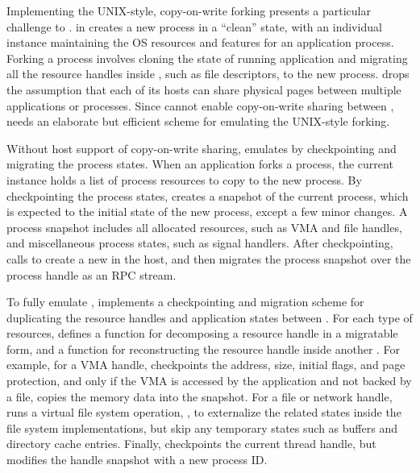 


Implementing the UNIX-style, copy-on-write forking presents a particular challenge to \graphene{}.
 in \thehostabi{}
creates a new process in a ``clean'' state, with an individual \thelibos{} instance maintaining the OS resources and features for an application process. %
Forking a process involves cloning the state of running application and migrating all the resource handles inside \thelibos{}, such as file descriptors, to the new process.
\graphene{} drops the assumption that each of its hosts can share physical pages between multiple applications or processes.
Since \thelibos{} cannot enable copy-on-write sharing between \picoprocs{}, \thelibos{} needs an elaborate but efficient scheme for emulating the UNIX-style forking.


Without host support of copy-on-write sharing,
\thelibos{} emulates  by checkpointing and migrating the process states.
When an application forks a process,
the current \thelibos{} instance holds a list of process resources to copy to the new process.
By checkpointing the process states,
\thelibos{} creates a snapshot of the current process,
which is expected to the initial state
of the new process,
except a few minor changes.
A process snapshot includes all allocated resources, such as VMA and file handles,
and miscellaneous process states, such as signal handlers.
After checkpointing,
\thelibos{} calls  to create a new \picoproc{} in the host, and then migrates the process snapshot over the process handle as an RPC stream. %


To fully emulate , \thelibos{} implements
a checkpointing and migration scheme
for duplicating the resource handles and application states between \picoprocs{}.
For each type of resources, \thelibos{} defines a function for decomposing a resource handle in a migratable form,
and a function for reconstructing the resource handle inside another \picoproc{}.
For example,
for a VMA handle, \thelibos{} checkpoints the address, size, initial flags, and page protection,
and only if the VMA is accessed by the application and not backed by a file,
\thelibos{} copies the memory data into the snapshot.
For a file or network handle,
\thelibos{} runs a virtual file system operation,
,
to externalize the related states
inside the file system implementations,
but skip any temporary states such as buffers and directory cache entries.
Finally, \thelibos{} checkpoints the current thread handle, but modifies the handle snapshot with a new process ID.



